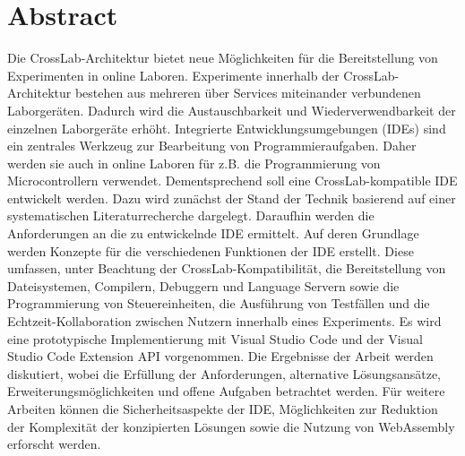 \section*{Abstract}
Die CrossLab-Architektur bietet neue Möglichkeiten für die Bereitstellung von Experimenten in online Laboren. Experimente innerhalb der CrossLab-Architektur bestehen aus mehreren über Services miteinander verbundenen Laborgeräten. Dadurch wird die Austauschbarkeit und Wiederverwendbarkeit der einzelnen Laborgeräte erhöht. Integrierte Entwicklungsumgebungen (IDEs) sind ein zentrales Werkzeug zur Bearbeitung von Programmieraufgaben. Daher werden sie auch in online Laboren für z.B. die Programmierung von Microcontrollern verwendet. Dementsprechend soll eine CrossLab-kompatible IDE entwickelt werden. Dazu wird zunächst der Stand der Technik basierend auf einer systematischen Literaturrecherche dargelegt. Daraufhin werden die Anforderungen an die zu entwickelnde IDE ermittelt. Auf deren Grundlage werden Konzepte für die verschiedenen Funktionen der IDE erstellt. Diese umfassen, unter Beachtung der CrossLab-Kompatibilität, die Bereitstellung von Dateisystemen, Compilern, Debuggern und Language Servern sowie die Programmierung von Steuereinheiten, die Ausführung von Testfällen und die Echtzeit-Kollaboration zwischen Nutzern innerhalb eines Experiments. Es wird eine prototypische Implementierung mit Visual Studio Code und der Visual Studio Code Extension API vorgenommen. Die Ergebnisse der Arbeit werden diskutiert, wobei die Erfüllung der Anforderungen, alternative Lösungsansätze, Erweiterungsmöglichkeiten und offene Aufgaben betrachtet werden. Für weitere Arbeiten können die Sicherheitsaspekte der IDE, Möglichkeiten zur Reduktion der Komplexität der konzipierten Lösungen sowie die Nutzung von WebAssembly erforscht werden.
\vspace*{\fill}
